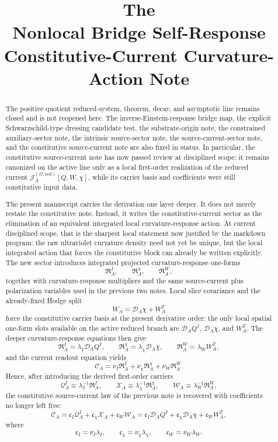 \documentclass[11pt]{article}
\title{\textbf{The \TheoryName{}}\\[0.4em]
\large Nonlocal Bridge Self-Response Constitutive-Current Curvature-Action Note}
\author{}
\date{}
\newcommand{\SpatialD}{\mathcal D}
\newcommand{\SourceCurrentRed}{\mathcal J^{(\Omega,\mathrm{red})}}
\newcommand{\ConstCurrent}{\mathcal C}
\newcommand{\QCarrier}{\mathcal Q}
\newcommand{\ChiCarrier}{\mathcal X}
\newcommand{\TransCarrier}{\mathcal W}
\begin{document}
\maketitle

\begin{abstract}
The positive quotient reduced-system, theorem, decay, and asymptotic line remains closed and is not reopened here. The inverse-Einstein-response bridge map, the explicit Schwarzschild-type dressing candidate test, the substrate-origin note, the constrained auxiliary-sector note, the intrinsic source-sector note, the source-current-sector note, and the constitutive source-current note are also fixed in status. In particular, the constitutive source-current note has now passed review at disciplined scope: it remains canonized on the active line only as a local first-order realization of the reduced current \(\SourceCurrentRed_A[Q,W,\chi]\), while its carrier basis and coefficients were still constitutive input data.

The present manuscript carries the derivation one layer deeper. It does not merely restate the constitutive note. Instead, it writes the constitutive-current sector as the elimination of an equivalent integrated local curvature-response action. At current disciplined scope, that is the sharpest local statement now justified by the markdown program: the raw ultraviolet curvature density need not yet be unique, but the local integrated action that forces the constitutive block can already be written explicitly. The new sector introduces integrated projected curvature-response one-forms
\[
\mathfrak R_A^I,
\qquad
\mathfrak R_A^\chi,
\qquad
\mathfrak R_A^W,
\]
together with curvature-response multipliers and the same source-current plus polarization variables used in the previous two notes. Local slice covariance and the already-fixed Hodge split
\[
W_A=\SpatialD_A\chi+W_A^T
\]
force the constitutive carrier basis at the present derivative order: the only local spatial one-form slots available on the active reduced branch are \(\SpatialD_AQ^I\), \(\SpatialD_A\chi\), and \(W_A^T\). The deeper curvature-response equations then give
\[
\mathfrak R_A^I=\lambda_I\SpatialD_AQ^I,
\qquad
\mathfrak R_A^\chi=\lambda_\chi\SpatialD_A\chi,
\qquad
\mathfrak R_A^W=\lambda_WW_A^T,
\]
and the current readout equation yields
\[
\ConstCurrent_A
=
\nu_I\mathfrak R_A^I
+\nu_\chi\mathfrak R_A^\chi
+\nu_W\mathfrak R_A^W.
\]
Hence, after introducing the derived first-order carriers
\[
\QCarrier_A^I\equiv \lambda_I^{-1}\mathfrak R_A^I,
\qquad
\ChiCarrier_A\equiv \lambda_\chi^{-1}\mathfrak R_A^\chi,
\qquad
\TransCarrier_A\equiv \lambda_W^{-1}\mathfrak R_A^W,
\]
the constitutive source-current law of the previous note is recovered with coefficients no longer left free:
\[
\ConstCurrent_A
=
\mathfrak c_I\QCarrier_A^I
+\mathfrak c_\chi\ChiCarrier_A
+\mathfrak c_W\TransCarrier_A
=
\mathfrak c_I\SpatialD_AQ^I
+\mathfrak c_\chi\SpatialD_A\chi
+\mathfrak c_WW_A^T,
\]
where
\[
\mathfrak c_I=\nu_I\lambda_I,
\qquad
\mathfrak c_\chi=\nu_\chi\lambda_\chi,
\qquad
\mathfrak c_W=\nu_W\lambda_W.
\]


\end{abstract}
\end{document}
